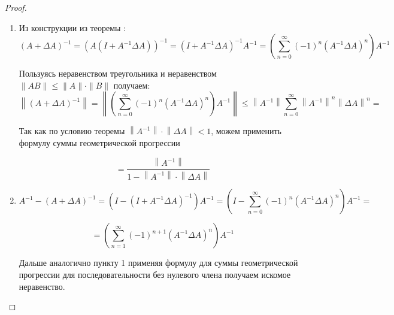\begin{proof}
    \begin{enumerate}
        \item Из конструкции из теоремы : 
        \[ (A+\Delta A)^{-1} = (A(I+A^{-1} \Delta A))^{-1} = (I+A^{-1} \Delta A)^{-1} A^{-1} = \left( \sum_{n=0}^\infty (-1)^n (A^{-1} \Delta A)^n \right) A^{-1}\]

        Пользуясь неравенством треугольника и неравенством $\|AB\| \leqslant \|A\| \cdot \|B\|$ получаем:
        \[ \left\| (A+ \Delta A)^{-1} \right\| = \left\| \left( \sum_{n=0}^\infty (-1)^n \left(A^{-1} \Delta A \right)^n \right) A^{-1} \right\| \leqslant \left\| A^{-1} \right\| \sum_{n=0}^\infty \left\| A^{-1}\right\|^n \left\| \Delta A \right\|^n = \]

        Так как по условию теоремы $\left\| A^{-1} \right\| \cdot \left\| \Delta A \right\| < 1$, можем применить формулу суммы геометрической прогрессии

        \[ = \frac{\left\|A^{-1} \right\|}{1 - \left\| A^{-1} \right\| \cdot \left\| \Delta A \right\|}\]

        \item \[ A^{-1} - (A + \Delta A)^{-1} = \left(I - \left(I+A^{-1} \Delta A \right)^{-1} \right) A^{-1} = \left(I - \sum_{n=0}^\infty (-1)^n \left(A^{-1} \Delta A \right)^n \right) A^{-1} = \]
        
        \[ = \left(\sum_{n=1}^\infty (-1)^{n+1} (A^{-1} \Delta A)^n\right) A^{-1} \]

        Дальше аналогично пункту 1 применяя формулу для суммы геометрической прогрессии для последовательности без нулевого члена получаем искомое неравенство.
    \end{enumerate}
\end{proof}